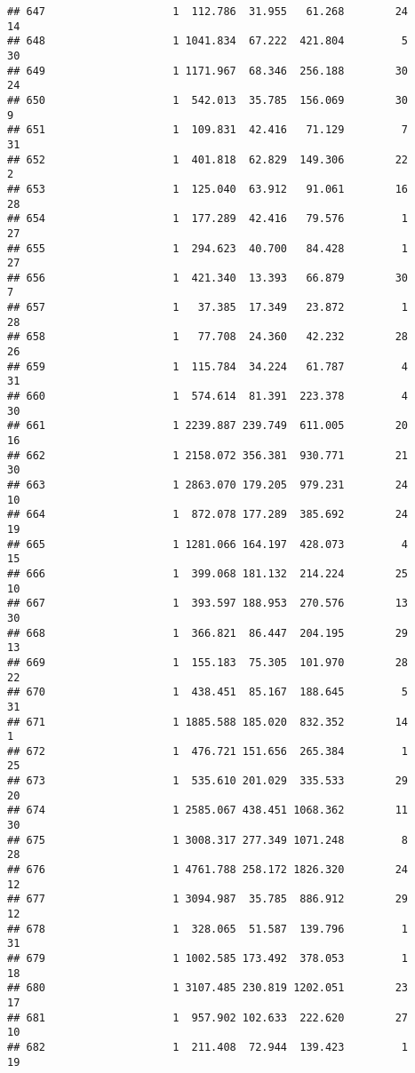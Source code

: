 \documentclass[
]{article}
\begin{document}
\begin{verbatim}
## 647                    1  112.786  31.955   61.268        24        14
## 648                    1 1041.834  67.222  421.804         5        30
## 649                    1 1171.967  68.346  256.188        30        24
## 650                    1  542.013  35.785  156.069        30         9
## 651                    1  109.831  42.416   71.129         7        31
## 652                    1  401.818  62.829  149.306        22         2
## 653                    1  125.040  63.912   91.061        16        28
## 654                    1  177.289  42.416   79.576         1        27
## 655                    1  294.623  40.700   84.428         1        27
## 656                    1  421.340  13.393   66.879        30         7
## 657                    1   37.385  17.349   23.872         1        28
## 658                    1   77.708  24.360   42.232        28        26
## 659                    1  115.784  34.224   61.787         4        31
## 660                    1  574.614  81.391  223.378         4        30
## 661                    1 2239.887 239.749  611.005        20        16
## 662                    1 2158.072 356.381  930.771        21        30
## 663                    1 2863.070 179.205  979.231        24        10
## 664                    1  872.078 177.289  385.692        24        19
## 665                    1 1281.066 164.197  428.073         4        15
## 666                    1  399.068 181.132  214.224        25        10
## 667                    1  393.597 188.953  270.576        13        30
## 668                    1  366.821  86.447  204.195        29        13
## 669                    1  155.183  75.305  101.970        28        22
## 670                    1  438.451  85.167  188.645         5        31
## 671                    1 1885.588 185.020  832.352        14         1
## 672                    1  476.721 151.656  265.384         1        25
## 673                    1  535.610 201.029  335.533        29        20
## 674                    1 2585.067 438.451 1068.362        11        30
## 675                    1 3008.317 277.349 1071.248         8        28
## 676                    1 4761.788 258.172 1826.320        24        12
## 677                    1 3094.987  35.785  886.912        29        12
## 678                    1  328.065  51.587  139.796         1        31
## 679                    1 1002.585 173.492  378.053         1        18
## 680                    1 3107.485 230.819 1202.051        23        17
## 681                    1  957.902 102.633  222.620        27        10
## 682                    1  211.408  72.944  139.423         1        19

\end{verbatim}
\end{document}
